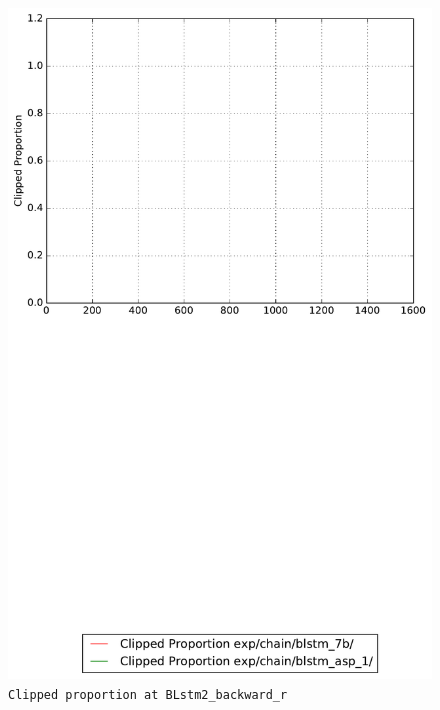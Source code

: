 \documentclass[prl,10pt,twocolumn]{revtex4}
\begin{document}
\newpage
\begin{figure}[h]
  \begin{center}
    \caption{\texttt{Clipped proportion at BLstm2\_backward\_r}}
    \includegraphics[width=\textwidth]{exp/chain/blstm_7b/report/clipped_proportion_BLstm2_backward_r.pdf}
  \end{center}
\end{figure}
\clearpage
\end{document}
